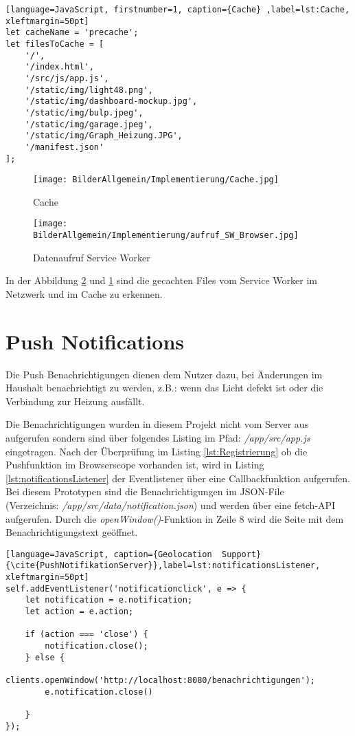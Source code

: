 \begin{lstlisting}[language=JavaScript, firstnumber=1, caption={Cache} ,label=lst:Cache, xleftmargin=50pt]
let cacheName = 'precache';
let filesToCache = [
    '/',
    '/index.html',
    '/src/js/app.js',
    '/static/img/light48.png',
    '/static/img/dashboard-mockup.jpg',
    '/static/img/bulp.jpeg',
    '/static/img/garage.jpeg',
    '/static/img/Graph_Heizung.JPG',
    '/manifest.json'
];
\end{lstlisting}


\begin{figure}[H]
	\centering
	\texttt{[image: BilderAllgemein/Implementierung/Cache.jpg]}\medskip
	\caption{Cache}
	\label{fig:Cache}
\end{figure}  

\begin{figure}[H]
	\centering
	\texttt{[image: BilderAllgemein/Implementierung/aufruf\_SW\_Browser.jpg]}\medskip
	\caption{Datenaufruf Service Worker}
	\label{fig:aufrufSWBrowser}
\end{figure}  

In der Abbildung \ref{fig:aufrufSWBrowser} und \ref{fig:Cache} sind die gecachten Files vom Service Worker im Netzwerk und im Cache zu erkennen.



\clearpage
\section{Push Notifications}
Die Push Benachrichtigungen dienen dem Nutzer dazu, bei Änderungen im Haushalt benachrichtigt zu werden, z.B.: wenn das Licht defekt ist oder die Verbindung zur Heizung ausfällt.

Die Benachrichtigungen wurden in diesem Projekt nicht vom Server aus aufgerufen sondern sind über folgendes Listing im Pfad: \textit{/app/src/app.js} eingetragen. 
Nach der Überprüfung im Listing \ref{lst:Registrierung} ob die Pushfunktion im Browserscope vorhanden ist, wird in Listing \ref{lst:notificationsListener} der  Eventlistener über eine Callbackfunktion aufgerufen. Bei diesem Prototypen sind die Benachrichtigungen im JSON-File\\ (Verzeichnis: \textit{/app/src/data/notification.json}) und werden über eine fetch-API aufgerufen. Durch die \textit{openWindow()}-Funktion in Zeile 8 wird die Seite mit dem Benachrichtigungstext geöffnet.  
\\
\begin{lstlisting}[language=JavaScript, caption={Geolocation  Support} {\cite{PushNotifikationServer}},label=lst:notificationsListener, xleftmargin=50pt]
self.addEventListener('notificationclick', e => {
    let notification = e.notification;
    let action = e.action;

    if (action === 'close') {
        notification.close();
    } else {
        clients.openWindow('http://localhost:8080/benachrichtigungen');
        e.notification.close()

    }
});
\end{lstlisting}
\clearpage

